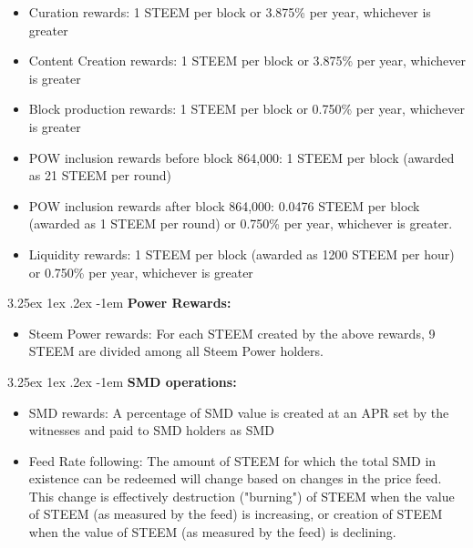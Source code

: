 \documentclass{article}
\makeatletter
\renewcommand\paragraph{\@startsection{paragraph}{5}{\z@}%
  {3.25ex \@plus1ex \@minus.2ex}%
  {-1em}%
  {\normalfont\normalsize\bfseries}}
\makeatother
\begin{document}
        \begin{itemize}
            \item Curation rewards: 1 STEEM per block or 3.875\% per year, whichever is greater
            \item Content Creation rewards: 1 STEEM per block or 3.875\% per year, whichever is greater
            \item Block production rewards: 1 STEEM per block or 0.750\% per year, whichever is greater
            \item POW inclusion rewards before block 864,000: 1 STEEM per block (awarded as 21 STEEM per round)
            \item POW inclusion rewards after block 864,000: 0.0476 STEEM per block (awarded as 1 STEEM per round) or 0.750\% per year, whichever is greater.
            \item Liquidity rewards: 1 STEEM per block (awarded as 1200 STEEM per hour) or 0.750\% per year, whichever is greater
        \end{itemize}

        \paragraph{}
            \textbf{Power Rewards:}

        \begin{itemize}
            \item Steem Power rewards: For each STEEM created by the above rewards, 9 STEEM are divided among all Steem Power holders.
        \end{itemize}

        \paragraph{}
            \textbf{SMD operations:}

        \begin{itemize}
            \item SMD rewards: A percentage of SMD value is created at an APR set by the witnesses and paid to SMD holders as SMD
            \item Feed Rate following: The amount of STEEM for which the total SMD in existence can be redeemed will change based on changes in the price feed. This change is effectively destruction ("burning") of STEEM when the value of STEEM (as measured by the feed) is increasing, or creation of STEEM when the value of STEEM (as measured by the feed) is declining.
        \end{itemize}
\end{document}
